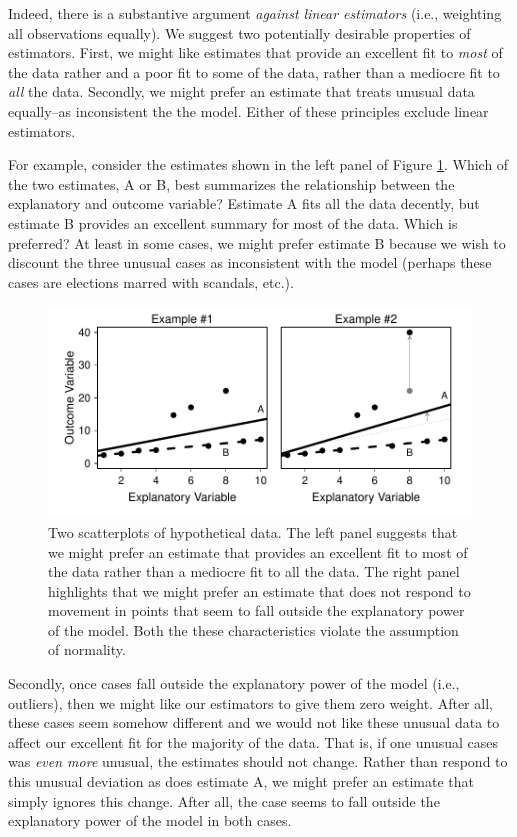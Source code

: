\documentclass[12pt]{article}
\begin{document}
Indeed, there is a substantive argument \textit{against linear estimators} (i.e., weighting all observations equally). We suggest two potentially desirable properties of estimators. First, we might like estimates that provide an excellent fit to \textit{most} of the data rather and a poor fit to some of the data, rather than a mediocre fit to \textit{all} the data. Secondly, we might prefer an estimate that treats unusual data equally--as inconsistent the the model. Either of these principles exclude linear estimators.

For example, consider the estimates shown in the left panel of Figure \ref{fig:best-fit-illustration}. Which of the two estimates, A or B, best summarizes the relationship between the explanatory and outcome variable? Estimate A fits all the data decently, but estimate B provides an excellent summary for most of the data. Which is preferred? At least in some cases, we might prefer estimate B because we wish to discount the three unusual cases as inconsistent with the model (perhaps these cases are elections marred with scandals, etc.).

\begin{figure}[H]
\begin{center}
\includegraphics[scale = .7]{figs/best-fit-illustration.pdf}
\caption{Two scatterplots of hypothetical data. The left panel suggests that we might prefer an estimate that provides an excellent fit to most of the data rather than a mediocre fit to all the data. The right panel highlights that we might prefer an estimate that does not respond to movement in points that seem to fall outside the explanatory power of the model. Both the these characteristics violate the assumption of normality.}\label{fig:best-fit-illustration}
\end{center}
\end{figure}

Secondly, once cases fall outside the explanatory power of the model (i.e., outliers), then we might like our estimators to give them zero weight. After all, these cases seem somehow different and we would not like these unusual data to affect our excellent fit for the majority of the data. That is, if one unusual cases was \textit{even more} unusual, the estimates should not change. Rather than respond to this unusual deviation as does estimate A, we might prefer an estimate that simply ignores this change. After all, the case seems to fall outside the explanatory power of the model in both cases.
\end{document}
